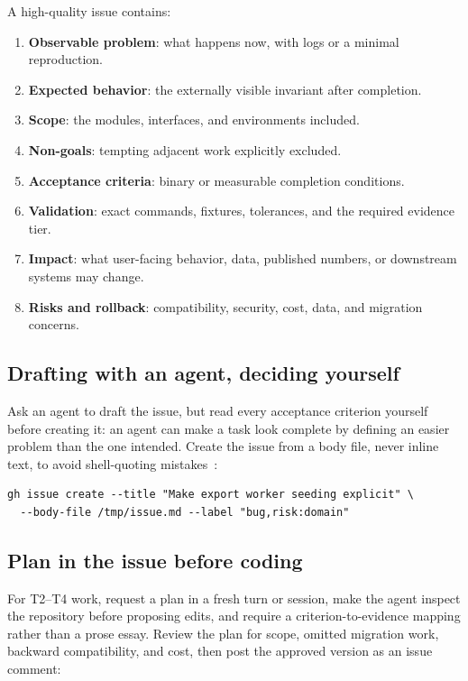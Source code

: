 \documentclass[11pt]{article}
\begin{document}
A high-quality issue contains:

\begin{enumerate}
  \item \textbf{Observable problem}: what happens now, with logs or a minimal reproduction.
  \item \textbf{Expected behavior}: the externally visible invariant after completion.
  \item \textbf{Scope}: the modules, interfaces, and environments included.
  \item \textbf{Non-goals}: tempting adjacent work explicitly excluded.
  \item \textbf{Acceptance criteria}: binary or measurable completion conditions.
  \item \textbf{Validation}: exact commands, fixtures, tolerances, and the required evidence tier.
  \item \textbf{Impact}: what user-facing behavior, data, published numbers, or downstream systems
    may change.
  \item \textbf{Risks and rollback}: compatibility, security, cost, data, and migration concerns.
\end{enumerate}

\subsection{Drafting with an agent, deciding yourself}

Ask an agent to draft the issue, but read every acceptance criterion yourself before creating it:
an agent can make a task look complete by defining an easier problem than the one intended.
Create the issue from a body file, never inline text, to avoid shell-quoting
mistakes~\cite{github2026cli}:

\begin{lstlisting}[style=gw]
gh issue create --title "Make export worker seeding explicit" \
  --body-file /tmp/issue.md --label "bug,risk:domain"
\end{lstlisting}

\subsection{Plan in the issue before coding}

For T2--T4 work, request a plan in a fresh turn or session, make the agent inspect the repository
before proposing edits, and require a criterion-to-evidence mapping rather than a prose essay.
Review the plan for scope, omitted migration work, backward compatibility, and cost, then post
the approved version as an issue comment:
\end{document}
